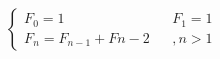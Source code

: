 \documentclass[preview]{standalone}
\begin{document}
\begin{align*}
\begin{equation}\begin{cases}F_0 = 1 && F_1 = 1\\F_n = F_{n - 1} + F{n - 2} &&, n > 1\end{cases}\end{equation}
\end{align*}
\end{document}
